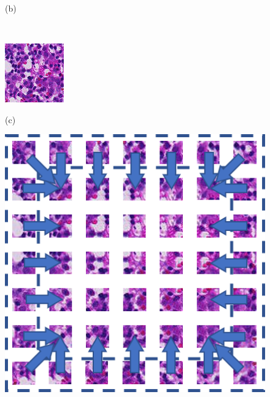\begin{figure}
\begin{minipage}[b]{0.48\linewidth}
		\centerline{(b)}\medskip
	\end{minipage}
	\\
	\begin{minipage}[b]{.48\linewidth}
		\centering
		\centerline{\includegraphics[width=\textwidth]{images/histo.png}}
		\centerline{(c)}\medskip
	\end{minipage}
	\hfill
	\begin{minipage}[b]{.48\linewidth}
		\centering
		\centerline{\includegraphics[width=\textwidth]{images/histo_grid.png}}

\end{minipage}
\end{figure}
